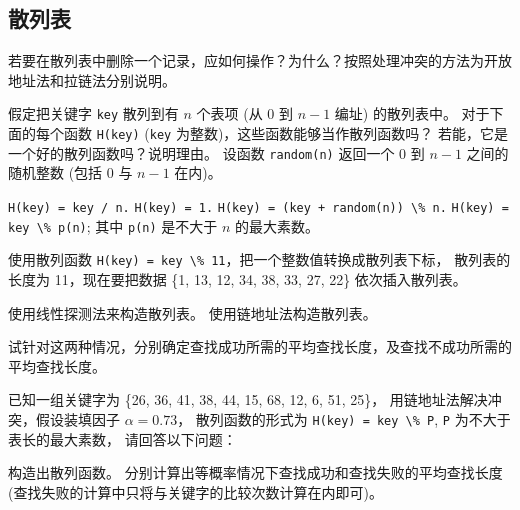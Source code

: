 \subsection{散列表}

\begin{qitems}
    \begin{bbox}
        \qitem 若要在散列表中删除一个记录，应如何操作？为什么？按照处理冲突的方法为开放地址法和拉链法分别说明。
    \end{bbox}
    \begin{bbox}
        \qitem 假定把关键字 \lstinline{key} 散列到有 $n$ 个表项 (从 0 到 $n-1$ 编址) 的散列表中。
        对于下面的每个函数 \lstinline{H(key)} (\lstinline{key} 为整数)，这些函数能够当作散列函数吗？
        若能，它是一个好的散列函数吗？说明理由。
        设函数 \lstinline{random(n)} 返回一个 0 到 $n-1$ 之间的随机整数 (包括 0 与 $n-1$ 在内)。
        \begin{subqitems}
            \subqitem \lstinline{H(key) = key / n.}
            \subqitem \lstinline{H(key) = 1.}
            \subqitem \lstinline{H(key) = (key + random(n)) \% n.}
            \subqitem \lstinline{H(key) = key \% p(n)}; 其中 \lstinline{p(n)} 是不大于 $n$ 的最大素数。
        \end{subqitems}
    \end{bbox}
    \begin{bbox}
        \qitem 使用散列函数 \lstinline{H(key) = key \% 11}，把一个整数值转换成散列表下标，
        散列表的长度为 11，现在要把数据 \{1, 13, 12, 34, 38, 33, 27, 22\} 依次插入散列表。
        \begin{subqitems}
            \subqitem 使用线性探测法来构造散列表。
            \subqitem 使用链地址法构造散列表。
        \end{subqitems}
        试针对这两种情况，分别确定查找成功所需的平均查找长度，及查找不成功所需的平均查找长度。
    \end{bbox}
    \begin{bbox}
        \qitem 已知一组关键字为 \{26, 36, 41, 38, 44, 15, 68, 12, 6, 51, 25\}，
        用链地址法解决冲突，假设装填因子 $\alpha = 0.73$，
        散列函数的形式为 \lstinline{H(key) = key \% P}, \lstinline{P} 为不大于表长的最大素数，
        请回答以下问题：
        \begin{subqitems}
            \subqitem 构造出散列函数。
            \subqitem 分别计算出等概率情况下查找成功和查找失败的平均查找长度 
            (查找失败的计算中只将与关键字的比较次数计算在内即可)。
        \end{subqitems}

\end{bbox}
\end{qitems}
